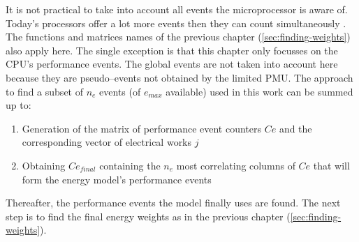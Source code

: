 \label{sec:min-events}

It is not practical to take into account all events the microprocessor is aware
of. Today's processors offer a lot more events then they can count
simultaneously \cite{intel2011softdev1}. The functions and matrices names of the
previous chapter (\ref{sec:finding-weights}) also apply here. The single
exception is that this chapter only focusses on the CPU's performance events.
The global events are not taken into account here because they are
pseudo--events not obtained by the limited PMU. The approach to find a subset of
$n_e$ events (of $e_{max}$ available) used in this work can be summed up to:

\begin{enumerate}

\item Generation of the matrix of performance event counters $Ce$ and
the corresponding vector of electrical works $j$

\item Obtaining $Ce_{final}$ containing the $n_e$ most correlating columns of
$Ce$ that will form the energy model's performance events

\end{enumerate}

Thereafter, the performance events the model finally uses are found. The next
step is to find the final energy weights as in the previous chapter
(\ref{sec:finding-weights}).



